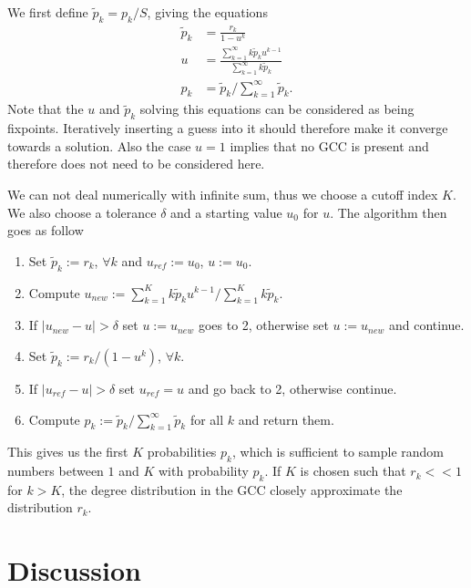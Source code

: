 \documentclass[a4paper]{article}
\begin{document}
We first define $\tilde{p}_k = p_k/S$, giving the equations
\begin{align}
	\tilde{p}_k &= \frac{r_k}{1 - u^k} \\
	u &= \frac{\sum_{k=1}^\infty k \tilde{p}_k u^{k-1}}{\sum_{k=1}^\infty k \tilde{p}_k}\\
	p_k &= \tilde{p}_k / \sum_{k=1}^\infty \tilde{p}_k.
\end{align}
Note that the $u$ and $\tilde{p}_k$ solving this equations can be considered as being fixpoints. Iteratively inserting a guess into it should therefore make it converge towards a solution. Also the case $u = 1$ implies that no GCC is present and therefore does not need to be considered here.

We can not deal numerically with infinite sum, thus we choose a cutoff index $K$. We also choose a tolerance $\delta$ and a starting value $u_0$ for $u$. The algorithm then goes as follow
\begin{enumerate}
	\item Set $\tilde{p}_k := r_k$, $\forall k$ and $u_{ref} := u_0$, $u := u_0$.
	\item Compute $u_{new} := \sum_{k=1}^K k \tilde{p}_k u^{k-1} / \sum_{k=1}^K k \tilde{p}_k$.
	\item If $|u_{new} - u| > \delta$ set $u := u_{new}$ goes to 2, otherwise set $u := u_{new}$ and continue.
	\item Set $\tilde{p}_k := r_k/(1 - u^k)$, $\forall k$.
	\item If $|u_{ref} - u| > \delta$ set $u_{ref} = u$ and go back to 2, otherwise continue.
	\item Compute $p_k := \tilde{p}_k / \sum_{k=1}^\infty \tilde{p}_k$ for all $k$ and return them.
\end{enumerate}

This gives us the first $K$ probabilities $p_k$, which is sufficient to sample random numbers between $1$ and $K$ with probability $p_k$. If $K$ is chosen such that $r_k << 1$ for $k > K$, the degree distribution in the GCC closely approximate the distribution $r_k$.

\begin{figure}
\end{figure}


\section{Discussion}

\end{document}
